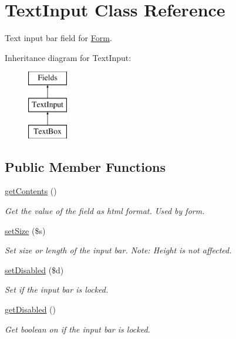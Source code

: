 \hypertarget{class_text_input}{\section{Text\-Input Class Reference}
\label{class_text_input}
}


Text input bar field for \hyperlink{class_form}{Form}.  


Inheritance diagram for Text\-Input\-:\begin{figure}[H]
\begin{center}
\leavevmode
\includegraphics[height=3.000000cm]{class_text_input}
\end{center}
\end{figure}
\subsection*{Public Member Functions}
\begin{DoxyCompactItemize}
\item 
\hypertarget{class_text_input_a14814e04b348120748912692645f3a75}{\hyperlink{class_text_input_a14814e04b348120748912692645f3a75}{get\-Contents} ()}\label{class_text_input_a14814e04b348120748912692645f3a75}

\begin{DoxyCompactList}\small\item\em Get the value of the field as html format. Used by form. \end{DoxyCompactList}\item 
\hypertarget{class_text_input_a342df365ed03aee6a74989a388dff8c9}{\hyperlink{class_text_input_a342df365ed03aee6a74989a388dff8c9}{set\-Size} (\$s)}\label{class_text_input_a342df365ed03aee6a74989a388dff8c9}

\begin{DoxyCompactList}\small\item\em Set size or length of the input bar. Note\-: Height is not affected. \end{DoxyCompactList}\item 
\hyperlink{class_text_input_aef96c9ec2037beea335cd47fe7978bcc}{set\-Disabled} (\$d)
\begin{DoxyCompactList}\small\item\em Set if the input bar is locked. \end{DoxyCompactList}\item 
\hypertarget{class_text_input_acb30698aae42539e2b9ea3f6d172ce46}{\hyperlink{class_text_input_acb30698aae42539e2b9ea3f6d172ce46}{get\-Disabled} ()}\label{class_text_input_acb30698aae42539e2b9ea3f6d172ce46}

\begin{DoxyCompactList}\small\item\em Get boolean on if the input bar is locked. \end{DoxyCompactList}\end{DoxyCompactItemize}
